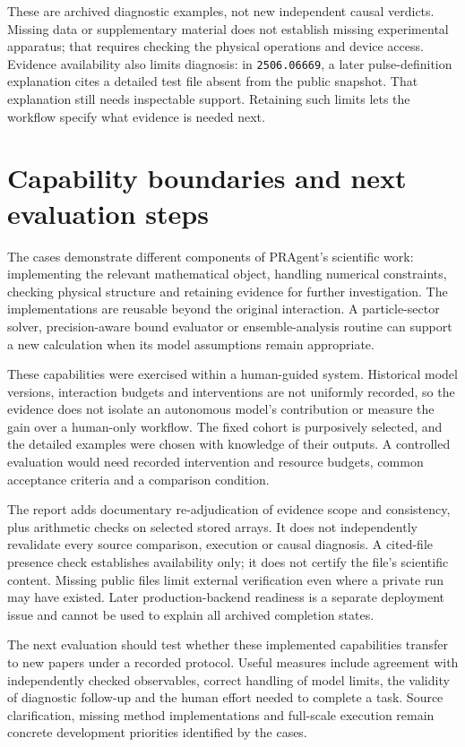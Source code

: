 \documentclass[10pt,a4paper]{article}
\begin{document}
These are archived diagnostic examples, not new independent causal
verdicts. Missing data or supplementary material does not establish
missing experimental apparatus; that requires checking the physical
operations and device access. Evidence availability also limits
diagnosis: in \texttt{2506.06669}, a later pulse-definition explanation
cites a detailed test file absent from the public snapshot. That
explanation still needs inspectable support. Retaining such limits lets
the workflow specify what evidence is needed next.

\section{Capability boundaries and next evaluation
steps}\label{capability-boundaries-and-next-evaluation-steps}

The cases demonstrate different components of PRAgent's scientific work:
implementing the relevant mathematical object, handling numerical
constraints, checking physical structure and retaining evidence for
further investigation. The implementations are reusable beyond the
original interaction. A particle-sector solver, precision-aware bound
evaluator or ensemble-analysis routine can support a new calculation
when its model assumptions remain appropriate.

These capabilities were exercised within a human-guided system.
Historical model versions, interaction budgets and interventions are not
uniformly recorded, so the evidence does not isolate an autonomous
model's contribution or measure the gain over a human-only workflow. The
fixed cohort is purposively selected, and the detailed examples were
chosen with knowledge of their outputs. A controlled evaluation would
need recorded intervention and resource budgets, common acceptance
criteria and a comparison condition.

The report adds documentary re-adjudication of evidence scope and
consistency, plus arithmetic checks on selected stored arrays. It does
not independently revalidate every source comparison, execution or
causal diagnosis. A cited-file presence check establishes availability
only; it does not certify the file's scientific content. Missing public
files limit external verification even where a private run may have
existed. Later production-backend readiness is a separate deployment
issue and cannot be used to explain all archived completion states.

The next evaluation should test whether these implemented capabilities
transfer to new papers under a recorded protocol. Useful measures
include agreement with independently checked observables, correct
handling of model limits, the validity of diagnostic follow-up and the
human effort needed to complete a task. Source clarification, missing
method implementations and full-scale execution remain concrete
development priorities identified by the cases.
\end{document}
